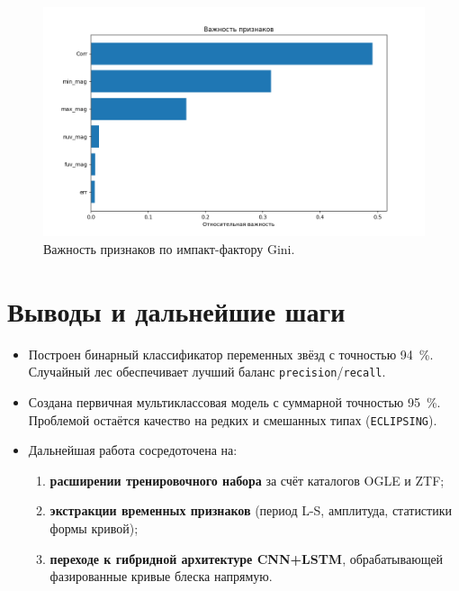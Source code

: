 \documentclass[12pt,a4paper]{article}
\begin{document}
\begin{figure}[H]
    \centering
    \includegraphics[width=.7\linewidth]{feature_importance.png}
    \caption{Важность признаков по импакт-фактору Gini.}
    \label{fig:feature-imp}
\end{figure}

\section{Выводы и дальнейшие шаги}
\begin{itemize}
    \item Построен бинарный классификатор переменных звёзд с точностью 94~\%. Случайный лес обеспечивает лучший баланс \texttt{precision}/\texttt{recall}.
    \item Создана первичная мультиклассовая модель с суммарной точностью 95~\%. Проблемой остаётся качество на редких и смешанных типах (\texttt{ECLIPSING}).
    \item Дальнейшая работа сосредоточена на:
    \begin{enumerate}
        \item \textbf{расширении тренировочного набора} за счёт каталогов OGLE и ZTF;
        \item \textbf{экстракции временных признаков} (период L-S, амплитуда, статистики формы кривой);
        \item \textbf{переходе к гибридной архитектуре CNN+LSTM}, обрабатывающей фазированные кривые блеска напрямую.
    \end{enumerate}
\end{itemize}
\end{document}
